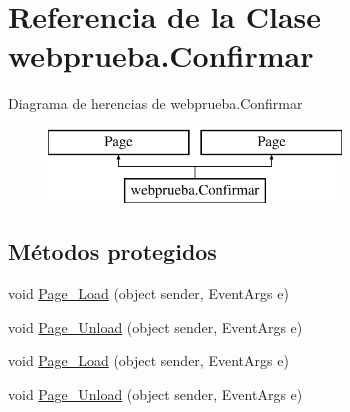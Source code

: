 \hypertarget{classwebprueba_1_1_confirmar}{}\section{Referencia de la Clase webprueba.\+Confirmar}
\label{classwebprueba_1_1_confirmar}
Diagrama de herencias de webprueba.\+Confirmar\begin{figure}[H]
\begin{center}
\leavevmode
\includegraphics[height=2.000000cm]{classwebprueba_1_1_confirmar}
\end{center}
\end{figure}
\subsection*{Métodos protegidos}
\begin{DoxyCompactItemize}
\item 
void \mbox{\hyperlink{classwebprueba_1_1_confirmar_a6fada9c94bfc49a7b14f0e9572cd3532}{Page\+\_\+\+Load}} (object sender, Event\+Args e)
\item 
void \mbox{\hyperlink{classwebprueba_1_1_confirmar_a0e04921adedeb203078699131ca958b0}{Page\+\_\+\+Unload}} (object sender, Event\+Args e)
\item 
void \mbox{\hyperlink{classwebprueba_1_1_confirmar_a6fada9c94bfc49a7b14f0e9572cd3532}{Page\+\_\+\+Load}} (object sender, Event\+Args e)
\item 
void \mbox{\hyperlink{classwebprueba_1_1_confirmar_a0e04921adedeb203078699131ca958b0}{Page\+\_\+\+Unload}} (object sender, Event\+Args e)
\end{DoxyCompactItemize}
